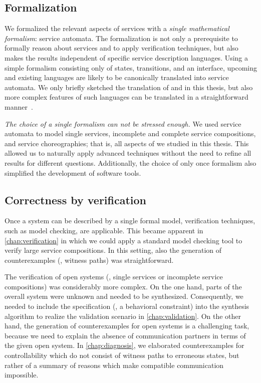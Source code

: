 \subsection*{Formalization}

We formalized the relevant aspects of services with a \emph{single mathematical formalism}: service automata. The formalization is not only a prerequisite to formally reason about services and to apply verification techniques, but also makes the results independent of specific service description languages. Using a simple formalism consisting only of states, transitions, and an interface, upcoming and existing languages are likely to be canonically translated into service automata. We only briefly sketched the translation of  and \bpelchor{} in this thesis, but also more complex features of such languages can be translated in a straightforward manner~\cite{LohmannVD_2008_topnoc}.

\emph{The choice of a single formalism can not be stressed enough.} We used service automata to model single services, incomplete and complete service compositions, and service choreographies; that is, all aspects of  we studied in this thesis. This allowed us to naturally apply advanced techniques without the need to refine all results for different questions. Additionally, the choice of only once formalism also simplified the development of software tools.




\subsection*{Correctness by verification}

Once a system can be described by a single formal model, verification techniques, such as model checking, are applicable. This became apparent in \autoref{chap:verification} in which we could apply a standard model checking tool to verify large service compositions. In this setting, also the generation of counterexamples (\ie, witness paths) was straightforward.

The verification of open systems (\ie, single services or incomplete service compositions) was considerably more complex. On the one hand, parts of the overall system were unknown and needed to be synthesized. Consequently, we needed to include the specification (\ie, a behavioral constraint) into the synthesis algorithm to realize the validation scenario in \autoref{chap:validation}. On the other hand, the generation of counterexamples for open systems is a challenging task, because we need to explain the absence of communication partners in terms of the given open system. In \autoref{chap:diagnosis}, we elaborated counterexamples for controllability which do not consist of witness paths to erroneous states, but rather of a summary of reasons which make compatible communication impossible.

